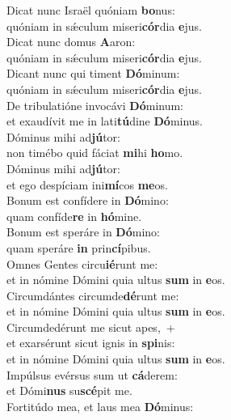 \evenverse Dicat nunc Israël quóniam \textbf{bo}nus:~\*\\
\evenverse quóniam in sǽculum miseri\textbf{cór}dia \textbf{e}jus.\\
\oddverse Dicat nunc domus \textbf{A}aron:~\*\\
\oddverse quóniam in sǽculum miseri\textbf{cór}dia \textbf{e}jus.\\
\evenverse Dicant nunc qui timent \textbf{Dó}minum:~\*\\
\evenverse quóniam in sǽculum miseri\textbf{cór}dia \textbf{e}jus.\\
\oddverse De tribulatióne invocávi \textbf{Dó}minum:~\*\\
\oddverse et exaudívit me in lati\textbf{tú}dine \textbf{Dó}minus.\\
\evenverse Dóminus mihi ad\textbf{jú}tor:~\*\\
\evenverse non timébo quid fáciat \textbf{mi}hi \textbf{ho}mo.\\
\oddverse Dóminus mihi ad\textbf{jú}tor:~\*\\
\oddverse et ego despíciam ini\textbf{mí}cos \textbf{me}os.\\
\evenverse Bonum est confídere in \textbf{Dó}mino:~\*\\
\evenverse quam confíde\textbf{re} in \textbf{hó}mine.\\
\oddverse Bonum est speráre in \textbf{Dó}mino:~\*\\
\oddverse quam speráre \textbf{in} prin\textbf{cí}pibus.\\
\evenverse Omnes Gentes circu\textbf{ié}runt me:~\*\\
\evenverse et in nómine Dómini quia ultus \textbf{sum} in \textbf{e}os.\\
\oddverse Circumdántes circumde\textbf{dé}runt me:~\*\\
\oddverse et in nómine Dómini quia ultus \textbf{sum} in \textbf{e}os.\\
\evenverse Circumdedérunt me sicut apes,~+\\
\evenverse  et exarsérunt sicut ignis in \textbf{spi}nis:~\*\\
\evenverse et in nómine Dómini quia ultus \textbf{sum} in \textbf{e}os.\\
\oddverse Impúlsus evérsus sum ut \textbf{cá}derem:~\*\\
\oddverse et Dómi\textbf{nus} su\textbf{scé}pit me.\\
\evenverse Fortitúdo mea, et laus mea \textbf{Dó}minus:~\*\\
